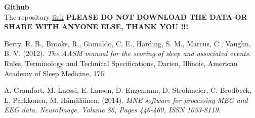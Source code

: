 \textbf {Github} \\ 
The repository \href{https://github.com/zhiyanwang27/decoding_sleep}{link} \textbf{PLEASE DO NOT DOWNLOAD THE DATA OR SHARE WITH ANYONE ELSE, THANK YOU !!!} 
\begin{thebibliography}{9}
Berry, R. B., Brooks, R., Gamaldo, C. E., Harding, S. M., Marcus, C., Vaughn, B. V. (2012). \textit{The AASM manual for the scoring of sleep and associated events.} Rules, Terminology and Technical Specifications, Darien, Illinois, American Academy of Sleep Medicine, 176.

A. Gramfort, M. Luessi, E. Larson, D. Engemann, D. Strohmeier, C. Brodbeck, L. Parkkonen, M. Hämäläinen. (2014). \textit{MNE software for processing MEG and EEG data, NeuroImage, Volume 86, Pages 446-460, ISSN 1053-8119}. 
 
\end{thebibliography}


 





